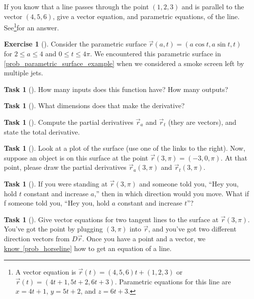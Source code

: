\documentclass[10pt,]{book}
\theoremstyle{plain}
\theoremstyle{definition}
\theoremstyle{definition}
\theoremstyle{definition}
\theoremstyle{definition}
\newtheorem{exploration}[project]{Exercise}
\newtheorem{task}[project]{Task}
\theoremstyle{definition}
\numberwithin{equation}{section}
\begin{document}
If you know that a line passes through the point \((1,2,3)\) and is parallel to the vector \((4,5,6)\), give a vector equation, and parametric equations, of the line. See\footnote{A vector equation is \(\vec r(t) = (4,5,6)t+(1,2,3)\) or \(\vec r(t) = (4t+1, 5t+2, 6t+3)\).  Parametric equations for this line are \(x=4t+1\), \(y=5t+2\), and \(z=6t+3\).\label{fn-1}}for an answer.%
\begin{exploration}[]\label{exploration-140}
Consider the parametric surface \(\vec r(a,t) = (a\cos t, a\sin t, t)\) for \(2\leq a\leq 4\) and \(0\leq t\leq 4\pi\). We encountered this parametric surface in \hyperref[prob_parametric_surface_example]{\ref{prob_parametric_surface_example}} when we considered a smoke screen left by multiple jets.%
\begin{task}[]\label{task-300}
How many inputs does this function have? How many outputs?%
\end{task}
\begin{task}[]\label{task-301}
What dimensions does that make the derivative?%
\end{task}
\begin{task}[]\label{task-302}
Compute the partial derivatives \(\vec r_a\) and \(\vec r_t\) (they are vectors), and state the total derivative.%
\end{task}
\begin{task}[]\label{task-303}
Look at a plot of the surface (use one of the links to the right). Now, suppose an object is on this surface at the point \(\vec r(3,\pi) = (-3,0,\pi)\). At that point, please draw the partial derivatives \(\vec r_a(3,\pi)\) and \(\vec r_t(3,\pi)\). %
\end{task}
\begin{task}[]\label{task-304}
If you were standing at \(\vec r(3,\pi)\) and someone told you, ``Hey you, hold \(t\) constant and increase \(a\),'' then in which direction would you move. What if f someone told you, ``Hey you, hold \(a\) constant and increase \(t\)''?%
\end{task}
\begin{task}[]\label{task-305}
Give vector equations for two tangent lines to the surface at \(\vec r(3,\pi)\). You've got the point by plugging \((3,\pi)\) into \(\vec r\), and you've got two different direction vectors from \(D\vec r\). Once you have a point and a vector, we \hyperref[prob_horseline]{know~\ref{prob_horseline}} how to get an equation of a line.%
%
\end{task}
\end{exploration}
\end{document}
